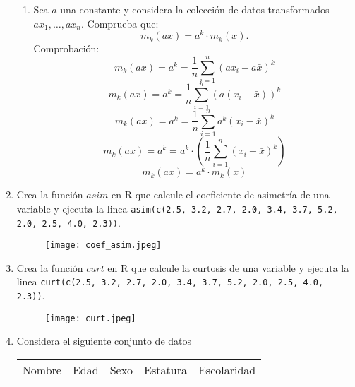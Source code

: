 \documentclass[11pt,a4paper]{report}
\begin{document}
\begin{enumerate}
\begin{enumerate}
\item Sea $a$ una constante y considera la colección de datos transformados $a x_1, \dots, a x_n$. Comprueba que:
    \[m_k(a x) = a^k \cdot m_k(x).\]
    Comprobación:
    \[m_k(a x) = a^k=\frac{1}{n} \sum_{i=1}^n(ax_i-a\bar{x})^k\]
    \[m_k(a x) = a^k=\frac{1}{n} \sum_{i=1}^n(a(x_i-\bar{x}))^k\]
    \[m_k(a x) = a^k=\frac{1}{n} \sum_{i=1}^n a^k(x_i-\bar{x})^k\]
    \[m_k(a x) = a^k=a^k\cdot (\frac{1}{n} \sum_{i=1}^n (x_i-\bar{x})^k)\]
    \[m_k(a x) = a^k \cdot m_k(x)\]
    
\end{enumerate}
\item Crea la función $asim$ en R que calcule el coeficiente de asimetría de una variable y ejecuta la linea \texttt{asim(c(2.5, 3.2, 2.7, 2.0, 3.4, 3.7, 5.2, 2.0, 2.5, 4.0, 2.3))}. \\
\begin{figure}[h]
            \centering
        \texttt{[image: coef\_asim.jpeg]}
            \label{fig:enter-label}
\end{figure}

\item Crea la función $curt$ en R que calcule la curtosis de una variable y ejecuta la linea \texttt{curt(c(2.5, 3.2, 2.7, 2.0, 3.4, 3.7, 5.2, 2.0, 2.5, 4.0, 2.3))}.
\begin{figure}[h]
            \centering
        \texttt{[image: curt.jpeg]}
            \label{fig:enter-label}
\end{figure}

\item Considera el siguiente conjunto de datos 
\begin{table}[h]
    \begin{center}
    \begin{tabular}{|l| c| c| r |l| }
        \hline
        Nombre&Edad&Sexo&Estatura&Escolaridad\\
        

\end{tabular}
\end{center}
\end{table}
\end{enumerate}
\end{document}
